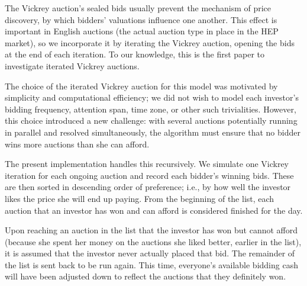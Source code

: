 \documentclass[twoside]{article}
\begin{document}
 The Vickrey auction's sealed bids usually prevent the mechanism of price discovery, by which bidders' valuations influence one another. This effect is important in English auctions (the actual auction type in place in the HEP market), so we incorporate it by iterating the Vickrey auction, opening the bids at the end of each iteration. To our knowledge, this is the first paper to investigate iterated Vickrey auctions.

The choice of the iterated Vickrey auction for this model was motivated by simplicity and computational efficiency; we did not wish to model each investor's bidding frequency, attention span, time zone, or other such trivialities. However, this choice introduced a new challenge: with several auctions potentially running in parallel and resolved simultaneously, the algorithm must ensure  that no bidder wins more auctions than she can afford.

The present implementation handles this recursively. We simulate one Vickrey iteration for each ongoing auction and record each bidder's winning bids. These are then sorted in descending order of preference; i.e., by how well the investor likes the price she will end up paying. From the beginning of the list, each auction that an investor has won and can afford is considered finished for the day.

Upon reaching an auction in the list that the investor has won but cannot afford (because she spent her money on the auctions she liked better, earlier in the list), it is assumed that the investor never actually placed that bid. The remainder of the list is sent back to be run again. This time, everyone's available bidding cash will have been adjusted down to reflect the auctions that they definitely won.







\end{document}

